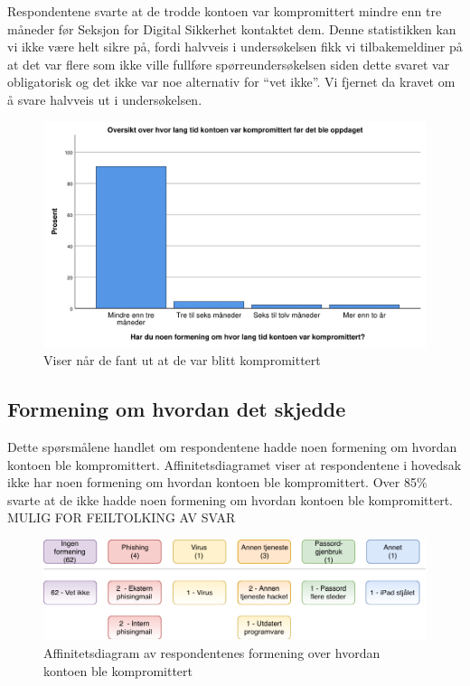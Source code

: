 Respondentene svarte at de trodde kontoen var kompromittert mindre enn tre måneder før Seksjon for Digital Sikkerhet kontaktet dem. Denne statistikken kan vi ikke være helt sikre på, fordi halvveis i undersøkelsen fikk vi tilbakemeldiner på at det var flere som ikke ville fullføre spørreundersøkelsen siden dette svaret var obligatorisk og det ikke var noe alternativ for ``vet ikke''. Vi fjernet da kravet om å svare halvveis ut i undersøkelsen. 
\begin{figure}[H]
    \centering
    \includegraphics[scale=0.5]{case_2/bilder/spss/lang_tid_konto_kompromittert.pdf}
    \caption[fant-ut-kompromittert]{Viser når de fant ut at de var blitt kompromittert}
    \label{fig:fant-ut-kompromittert}
\end{figure}

\subsection{Formening om hvordan det skjedde}
Dette spørsmålene handlet om respondentene hadde noen formening om hvordan kontoen ble kompromittert. Affinitetsdiagramet viser at respondentene i hovedsak ikke har noen formening om hvordan kontoen ble kompromittert. Over 85\% svarte at de ikke hadde noen formening om hvordan kontoen ble kompromittert. MULIG FOR FEILTOLKING AV SVAR
\begin{figure}[H]
    \centering
    \includegraphics[scale=0.8]{case_2/bilder/Affinitetsdiagram.pdf}
    \caption[affinitetsdiagram]{Affinitetsdiagram av respondentenes formening over hvordan kontoen ble kompromittert}
    \label{fig:case2-affinitetsdiagram}
\end{figure}

